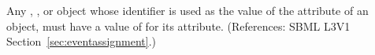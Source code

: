Any \Compartment, \Species, \Parameter or \SpeciesReference object whose
identifier is used as the value of the attribute  of an
\EventAssignment object, must have a value of  for its
 attribute.  (References: SBML L3V1
Section~\ref{sec:eventassignment}.)
